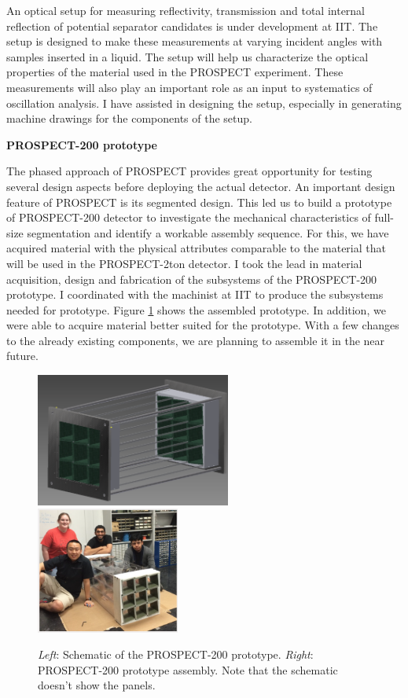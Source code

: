 \documentclass[11pt]{article}
\numberwithin{equation}{section}
\begin{document}
An optical setup for measuring reflectivity, transmission and total internal reflection of potential separator candidates is under development at IIT. The setup is designed to make these measurements at varying incident angles with samples inserted in a liquid. The setup will help us characterize the optical properties of the material used in the PROSPECT experiment. These measurements will also play an important role as an input to systematics of oscillation analysis. I have assisted in designing the setup, especially in generating machine drawings for the components of the setup. 

\noindent
\textbf{PROSPECT-200 prototype}

\noindent
The phased approach of PROSPECT provides great opportunity for testing several design aspects before deploying the actual detector. An important design feature of PROSPECT is its segmented design. This led us to build a prototype of PROSPECT-200 detector to investigate the mechanical characteristics of full-size segmentation and identify a workable assembly sequence. For this, we have acquired material with the physical attributes comparable to the material that will be used in the PROSPECT-2ton detector. I took the lead in material acquisition, design and fabrication of the subsystems of the PROSPECT-200 prototype. I coordinated with the machinist at IIT to produce the subsystems needed for prototype. Figure \ref{fig:assembly} shows the assembled prototype. In addition, we were able to acquire material better suited for the prototype. With a few changes to the already existing components, we are planning to assemble it in the near future.
 \begin{figure}[h]
\centering
\includegraphics*[width=0.57\textwidth]{./assemblySchematic.PNG}
\includegraphics*[width=0.42\textwidth]{./assemblyPicture.PNG}
\caption[PROSPECT-200 prototype]{\textit{Left}: Schematic of the PROSPECT-200 prototype. \textit{Right}: PROSPECT-200 prototype assembly. Note that the schematic doesn't show the panels.}
\label{fig:assembly}
\end{figure}
\end{document}
